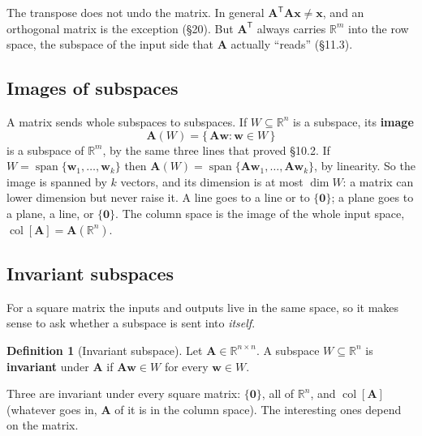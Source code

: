 \documentclass[11pt]{article}
\theoremstyle{plain}
\theoremstyle{definition}
\newtheorem{defn}{Definition}[section]
\theoremstyle{remark}
\newcommand{\R}{\mathbb{R}}
\newcommand{\vc}[1]{\mathbf{#1}}
\newcommand{\mt}[1]{\mathbf{#1}}
\newcommand{\T}{^{\mathsf{T}}}
\newcommand{\colsp}[1]{\operatorname{col}[#1]}
\DeclareMathOperator{\spanop}{span}
\begin{document}
\noindent The transpose does not undo the matrix. In general
$\mt{A}\T\mt{A}\vc{x}\neq\vc{x}$, and an orthogonal matrix is the exception
(\S20). But $\mt{A}\T$ always carries $\R^{m}$ into the row space, the subspace
of the input side that $\mt{A}$ actually ``reads'' (\S11.3).

\subsection{Images of subspaces}
A matrix sends whole subspaces to subspaces. If $W\subseteq\R^{n}$ is a
subspace, its \textbf{image}
\[
  \mt{A}(W)=\{\,\mt{A}\vc{w}:\vc{w}\in W\,\}
\]
is a subspace of $\R^{m}$, by the same three lines that proved \S10.2. If
$W=\spanop\{\vc{w}_1,\dots,\vc{w}_k\}$ then
$\mt{A}(W)=\spanop\{\mt{A}\vc{w}_1,\dots,\mt{A}\vc{w}_k\}$, by linearity. So the
image is spanned by $k$ vectors, and its dimension is at most $\dim W$: a matrix
can lower dimension but never raise it. A line goes to a line or to $\{\vc{0}\}$;
a plane goes to a plane, a line, or $\{\vc{0}\}$. The column space is the image
of the whole input space, $\colsp{\mt{A}}=\mt{A}(\R^{n})$.

\subsection{Invariant subspaces}
For a square matrix the inputs and outputs live in the same space, so it makes
sense to ask whether a subspace is sent into \emph{itself}.

\begin{defn}[Invariant subspace]
Let $\mt{A}\in\R^{n\times n}$. A subspace $W\subseteq\R^{n}$ is
\textbf{invariant} under $\mt{A}$ if $\mt{A}\vc{w}\in W$ for every
$\vc{w}\in W$.
\end{defn}

\noindent Three are invariant under every square matrix: $\{\vc{0}\}$, all of
$\R^{n}$, and $\colsp{\mt{A}}$ (whatever goes in, $\mt{A}$ of it is in the
column space). The interesting ones depend on the matrix.
\end{document}
